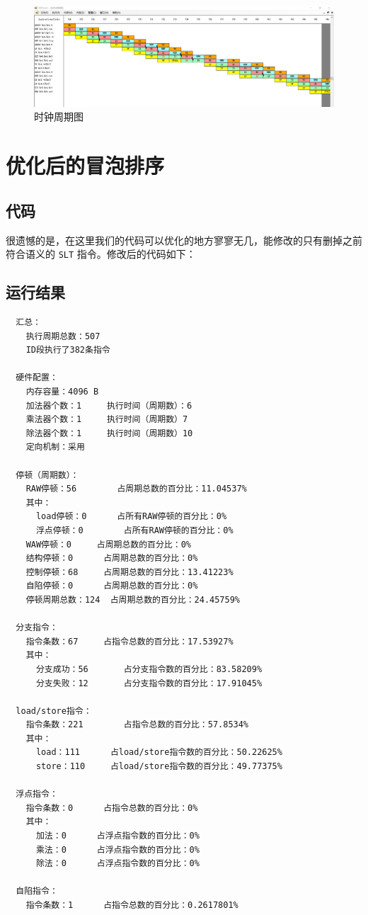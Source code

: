 \documentclass[blue,normal,cn]{elegantnote}
\newcommand{\code}[1]{\colorbox{light-gray}{\texttt{#1}}}
\begin{document}
\begin{figure}[H]
    \centering
    \includegraphics[width=.8\textwidth]{fig/naive_bubble_bypass.png}
    \caption{时钟周期图}
    \label{fig:naive_prod_bypass}
\end{figure}

\section{优化后的冒泡排序}

\subsection{代码}

很遗憾的是，在这里我们的代码可以优化的地方寥寥无几，能修改的只有删掉之前符合语义的 \code{SLT} 指令。修改后的代码如下：



\subsection{运行结果}

\begin{lstlisting}
  汇总：
    执行周期总数：507
    ID段执行了382条指令

  硬件配置：
    内存容量：4096 B
    加法器个数：1		执行时间（周期数）：6
    乘法器个数：1		执行时间（周期数）7		
    除法器个数：1		执行时间（周期数）10		
    定向机制：采用

  停顿（周期数）：
    RAW停顿：56		占周期总数的百分比：11.04537%
    其中：
      load停顿：0		占所有RAW停顿的百分比：0%
      浮点停顿：0		占所有RAW停顿的百分比：0%
    WAW停顿：0		占周期总数的百分比：0%
    结构停顿：0		占周期总数的百分比：0%
    控制停顿：68		占周期总数的百分比：13.41223%
    自陷停顿：0		占周期总数的百分比：0%
    停顿周期总数：124	占周期总数的百分比：24.45759%

  分支指令：
    指令条数：67		占指令总数的百分比：17.53927%
    其中：
      分支成功：56		占分支指令数的百分比：83.58209%
      分支失败：12		占分支指令数的百分比：17.91045%

  load/store指令：
    指令条数：221		占指令总数的百分比：57.8534%
    其中：
      load：111		占load/store指令数的百分比：50.22625%
      store：110		占load/store指令数的百分比：49.77375%

  浮点指令：
    指令条数：0		占指令总数的百分比：0%
    其中：
      加法：0		占浮点指令数的百分比：0%
      乘法：0		占浮点指令数的百分比：0%
      除法：0		占浮点指令数的百分比：0%

  自陷指令：
    指令条数：1		占指令总数的百分比：0.2617801%
\end{lstlisting}
\end{document}
